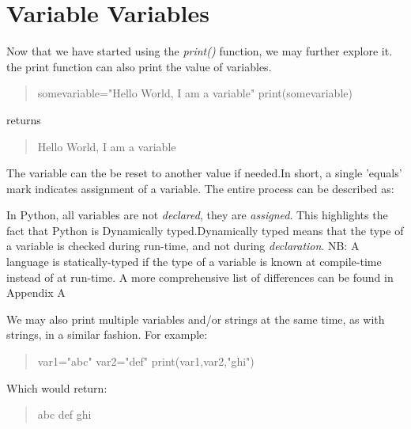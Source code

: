 \section{Variable Variables}
Now that we have started using the \emph{print()} function, we may further explore it.\newline 
the print function can also print the value of variables.
\begin{quote}
somevariable="Hello World, I am a variable"\newline 
print(somevariable)
\end{quote}
returns
\begin{quote}
Hello World, I am a variable
\end{quote}
The variable can the be reset to another value if needed.\newline  In short, a single 'equals' mark indicates assignment of a variable.\newline
The entire process can be described as: 
\begin{figure}[hbt]
\end{figure}
\newline 
In Python, all variables are not \emph{declared}, they are \emph{assigned}. This highlights the fact that Python is Dynamically typed.\newline  Dynamically typed means that the type of a variable is checked during run-time, and not during \emph{declaration}. \newline  \newline  
NB: A language is statically-typed if the type of a variable is known at compile-time instead of at run-time. A more comprehensive list of differences can be found in Appendix A
\newline  \newline 

We may also print multiple variables and/or strings at the same time, as with strings, in a similar fashion. For example:
\begin{quote}
var1="abc"\newline 
var2="def"\newline 
print(var1,var2,"ghi")
\end{quote}

Which would return:
\begin{quote}
abc def ghi
\end{quote}

